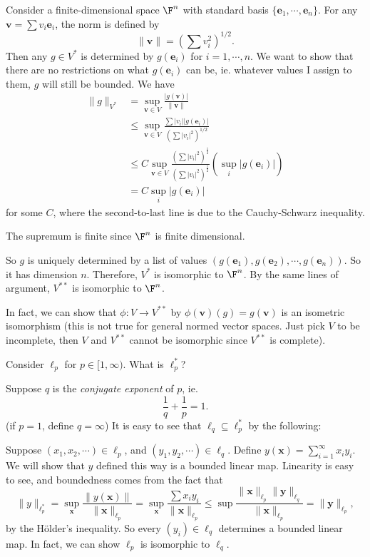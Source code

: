 \documentclass[a4paper]{article}
\begin{document}
\begin{eg}
  Consider a finite-dimensional space $\F^n$ with standard basis $\{\mathbf{e}_1, \cdots, \mathbf{e}_n\}$. For any $\mathbf{v} = \sum v_i \mathbf{e}_i$, the norm is defined by
  \[
    \|\mathbf{v}\| = \left(\sum v_i^2\right)^{1/2}.
  \]
  Then any $g\in V^*$ is determined by $g(\mathbf{e}_i)$ for $i = 1, \cdots, n$. We want to show that there are no restrictions on what $g(\mathbf{e}_i)$ can be, ie. whatever values I assign to them, $g$ will still be bounded. We have
  \begin{align*}
    \|g\|_{V^*} &= \sup_{\mathbf{v}\in V}\frac{|g(\mathbf{v})|}{\|\mathbf{v}\|}\\
    &\leq \sup_{\mathbf{v}\in V}\frac{\sum |v_i||g(\mathbf{e}_i)|}{(\sum |v_i|^2)^{1/2}}\\
    &\leq C\sup_{\mathbf{v}\in V}\frac{(\sum |v_i|^2)^{\frac{1}{2}}}{(\sum|v_i|^2)^{\frac{1}{2}}}\left(\sup_i |g(\mathbf{e}_i)|\right)\\
    &= C\sup_i |g(\mathbf{e}_i)|
  \end{align*}
  for some $C$, where the second-to-last line is due to the Cauchy-Schwarz inequality.

  The supremum is finite since $\F^n$ is finite dimensional.

  So $g$ is uniquely determined by a list of values $(g(\mathbf{e}_1), g(\mathbf{e}_2), \cdots, g(\mathbf{e}_n))$. So it has dimension $n$. Therefore, $V^*$ is isomorphic to $\F^n$. By the same lines of argument, $V^{**}$ is isomorphic to $\F^n$.

  In fact, we can show that $\phi: V\to V^{**}$ by $\phi(\mathbf{v})(g) = g(\mathbf{v})$ is an isometric isomorphism (this is not true for general normed vector spaces. Just pick $V$ to be incomplete, then $V$ and $V^{**}$ cannot be isomorphic since $V^{**}$ is complete).
\end{eg}

\begin{eg}
  Consider $\ell_p$ for $p\in [1, \infty)$. What is $\ell_p^*$?

    Suppose $q$ is the \emph{conjugate exponent} of $p$, ie.
    \[
      \frac{1}{q} + \frac{1}{p} = 1.
    \]
    (if $p = 1$, define $q = \infty$) It is easy to see that $\ell_q \subseteq \ell_p^*$ by the following:

    Suppose $(x_1, x_2, \cdots) \in \ell_p$, and $(y_1, y_2, \cdots)\in \ell_q$. Define $y(\mathbf{x}) = \sum_{i = 1}^\infty x_i y_i$. We will show that $y$ defined this way is a bounded linear map. Linearity is easy to see, and boundedness comes from the fact that
    \[
      \|y\|_{\ell_p^*} = \sup_{\mathbf{x}}\frac{\|y(\mathbf{x})\|}{\|\mathbf{x}\|_{\ell_p}} = \sup_{\mathbf{x}} \frac{\sum x_i y_i}{\|\mathbf{x}\|_{\ell_p}} \leq \sup \frac{\|\mathbf{x}\|_{\ell_p}\|\mathbf{y}\|_{\ell_q}}{\|\mathbf{x}\|_{\ell_p}} = \|\mathbf{y}\|_{\ell_p},
    \]
    by the H\"older's inequality. So every $(y_i) \in \ell_q$ determines a bounded linear map. In fact, we can show $\ell_p$ is isomorphic to $\ell_q$.
\end{eg}
\end{document}
